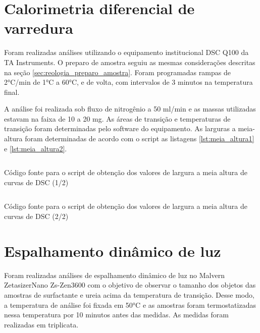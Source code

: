		\section{Calorimetria diferencial de varredura}
		
		Foram realizadas análises utilizando o equipamento institucional DSC Q100 da TA Instruments. O preparo de amostra seguiu as mesmas considerações descritas na seção \ref{sec:reologia_preparo_amostra}. Foram programadas rampas de 2°C/min de 1°C a 60°C, e de volta, com intervalos de 3 minutos na temperatura final.
		
		
		A análise foi realizada sob fluxo de nitrogênio a 50 ml/min e as massas utilizadas estavam na faixa de 10 a 20 mg. As áreas de transição e temperaturas de transição foram determinadas pelo software do equipamento. As larguras a meia-altura foram determinadas de acordo com o script as listagens \ref{lst:meia_altura1} e \ref{lst:meia_altura2}.
		
		\begin{listing}[H]
			\inputminted{python}{./python/meia_altura1.py}
			\caption{Código fonte para o script de obtenção dos valores de largura a meia altura de curvas de DSC (1/2)} 
			\label{lst:meia_altura1}
		\end{listing}
		
		\begin{listing}[H]
			\inputminted{python}{./python/meia_altura2.py}
			\caption{Código fonte para o script de obtenção dos valores de largura a meia altura de curvas de DSC (2/2)} 
			\label{lst:meia_altura2}
		\end{listing}

		\section{Espalhamento dinâmico de luz}
		
		Foram realizadas análises de espalhamento dinâmico de luz no Malvern ZetasizerNano Zs-Zen3600 com o objetivo de observar o tamanho dos objetos das amostras de surfactante e ureia acima da temperatura de transição. Desse modo, a temperatura de análise foi fixada em 50°C e as amostras foram termostatizadas nessa temperatura por 10 minutos antes das medidas. As medidas foram realizadas em triplicata.
		

